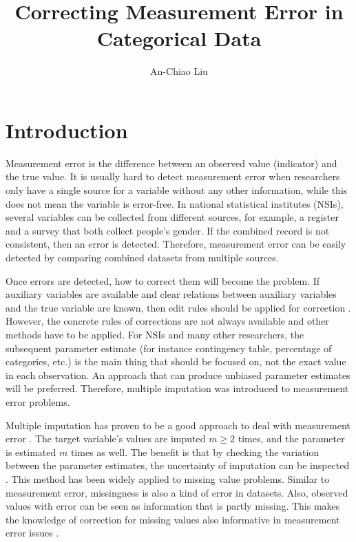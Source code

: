 \documentclass[oneside,a4paper]{article}
\begin{document}
\title{Correcting Measurement Error in Categorical Data}
\date{}
\author{An-Chiao Liu}

\maketitle

\section{Introduction}
Measurement error is the difference between an observed value (indicator) and the true value. It is usually hard to detect measurement error when researchers only have a single source for a variable without any other information, while this does not mean the variable is error-free. In national statistical institutes (NSIs), several variables can be collected from different sources, for example, a register and a survey that both collect people’s gender. If the combined record is not consistent, then an error is detected. Therefore, measurement error can be easily detected by comparing combined datasets from multiple sources. 

Once errors are detected, how to correct them will become the problem. If auxiliary variables are available and clear relations between auxiliary variables and the true variable are known, then edit rules should be applied for correction \cite{Thebook}. However, the concrete rules of corrections are not always available and other methods have to be applied. For NSIs and many other researchers, the subsequent parameter estimate (for instance contingency table, percentage of categories, etc.) is the main thing that should be focused on, not the exact value in each observation. An approach that can produce unbiased parameter estimates will be preferred. Therefore, multiple imputation was introduced to measurement error problems.

Multiple imputation has proven to be a good approach to deal with measurement error \cite{cole, MILC, MO1}. The target variable’s values are imputed $m\geq 2$ times, and the parameter is estimated $m$ times as well. The benefit is that by checking the variation between the parameter estimates, the uncertainty of imputation can be inspected \cite{bible}. This method has been widely applied to missing value problems. Similar to measurement error, missingness is also a kind of error in datasets. Also, observed values with error can be seen as information that is partly missing. This makes the knowledge of correction for missing values also informative in measurement error issues \cite{MO1}.
\end{document}
